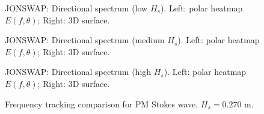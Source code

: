 \documentclass[11pt,letterpaper]{article}
\begin{document}
\begin{figure}[H]\centering
  \begin{minipage}{0.49\textwidth}
    \resizebox{\linewidth}{!}{}
  \end{minipage}\hfill
  \begin{minipage}{0.49\textwidth}
    \resizebox{\linewidth}{!}{}
  \end{minipage}
  \caption{JONSWAP: Directional spectrum (low $H_s$). Left: polar heatmap $E(f,\theta)$; Right: 3D surface.}
  \label{fig:jonswap_spec_low}
\end{figure}

\begin{figure}[H]\centering
  \begin{minipage}{0.49\textwidth}
    \resizebox{\linewidth}{!}{}
  \end{minipage}\hfill
  \begin{minipage}{0.49\textwidth}
    \resizebox{\linewidth}{!}{}
  \end{minipage}
  \caption{JONSWAP: Directional spectrum (medium $H_s$). Left: polar heatmap $E(f,\theta)$; Right: 3D surface.}
  \label{fig:jonswap_spec_medium}
\end{figure}

\begin{figure}[H]\centering
  \begin{minipage}{0.49\textwidth}
    \resizebox{\linewidth}{!}{}
  \end{minipage}\hfill
  \begin{minipage}{0.49\textwidth}
    \resizebox{\linewidth}{!}{}
  \end{minipage}
  \caption{JONSWAP: Directional spectrum (high $H_s$). Left: polar heatmap $E(f,\theta)$; Right: 3D surface.}
  \label{fig:jonswap_spec_high}
\end{figure}


\begin{figure}[H]\centering
  \resizebox{\textwidth}{!}{}
  \caption{Frequency tracking comparison for PM Stokes wave, $H_s = 0.270$ m.}
  \label{fig:freqtrack_pmstokes_low}
\end{figure}
\end{document}
